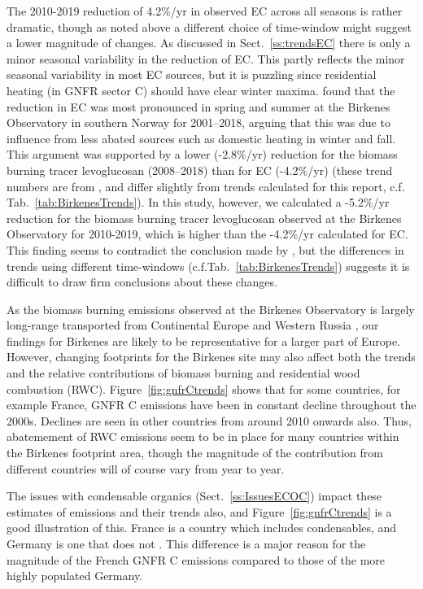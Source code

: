 The 2010-2019 reduction of 4.2\%/yr in observed EC across all seasons is rather dramatic, though as noted above a different choice of time-window might suggest a lower magnitude of changes. 
As discussed in Sect.~\ref{ss:trendsEC} there is only a minor seasonal variability in the reduction of EC. This partly reflects the minor seasonal variability in most EC sources, but it is puzzling since residential heating (in GNFR sector C) should have clear winter maxima. \citet{Yttri2021} found that the reduction in EC
was most pronounced in spring and summer at the Birkenes Observatory in
southern Norway for 2001--2018, arguing that this was due to influence
from less abated sources such as domestic heating in winter and fall. This argument was
supported by a lower (-2.8\%/yr) reduction for the biomass burning
tracer levoglucosan (2008--2018) than for EC (-4.2\%/yr) (these trend numbers are from \citeauthor{Yttri2021}, and differ slightly from trends calculated for this report, c.f. Tab.~\ref{tab:BirkenesTrends}). In this study, however, 
we calculated a -5.2\%/yr reduction for the biomass burning tracer
levoglucosan observed at the Birkenes Observatory for 2010-2019, which is
higher than the -4.2\%/yr calculated for EC.
This finding seems to contradict the conclusion made
by \citet{Yttri2021}, but the differences in trends using different time-windows (c.f.Tab.~\ref{tab:BirkenesTrends}) suggests it is difficult to draw firm conclusions about these changes.


As the biomass burning emissions observed at the
Birkenes Observatory is largely long-range transported from Continental
Europe and Western Russia \citep{Yttri2021}, our findings for Birkenes
are likely to be representative for a larger part of Europe. However,
changing footprints  for the Birkenes site may also affect both the trends and
the relative contributions of biomass burning and residential wood combustion (RWC).
Figure~\ref{fig:gnfrCtrends} shows that for some countries, for example France, GNFR C \pmfine emissions have been in constant decline throughout the 2000s. Declines are seen in other countries from around 2010 onwards also. Thus, abatemement of RWC emissions seem to be in place for many countries within the Birkenes footprint area, though the magnitude of the contribution from different countries will of course vary from year to year.

The issues with condensable organics (Sect.~\ref{ss:IssuesECOC}) impact these estimates of \pmfine emissions and their trends also, and Figure~\ref{fig:gnfrCtrends} is a good illustration of this. France is a country which includes condensables, and Germany is one that does not \citep{CONDws2020}. This difference is a major reason for the magnitude of the French GNFR C emissions compared to those of the more highly populated Germany. 


